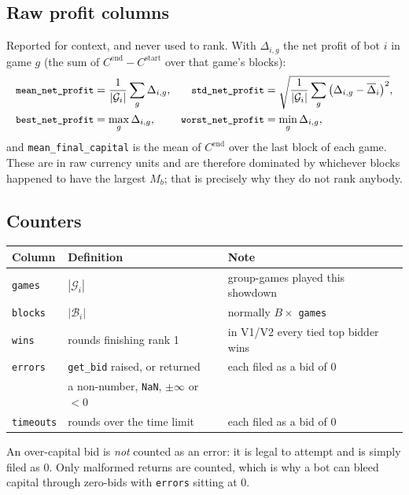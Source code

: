 \documentclass[11pt,a4paper]{article}
\newcommand{\code}[1]{\texttt{\small #1}}
\begin{document}
\subsection{Raw profit columns}
Reported for context, and never used to rank. With $\Delta_{i,g}$ the net profit
of bot $i$ in game $g$ (the sum of $C^{\text{end}} - C^{\text{start}}$ over that
game's blocks):
\begin{align}
  \text{\code{mean\_net\_profit}} &= \frac{1}{|\mathcal{G}_i|}\sum_{g} \Delta_{i,g}, &
  \text{\code{std\_net\_profit}}  &= \sqrt{\frac{1}{|\mathcal{G}_i|}\sum_{g}
      \left(\Delta_{i,g} - \overline{\Delta}_i\right)^2}, \\
  \text{\code{best\_net\_profit}} &= \max_g \Delta_{i,g}, &
  \text{\code{worst\_net\_profit}} &= \min_g \Delta_{i,g},
\end{align}
and \code{mean\_final\_capital} is the mean of $C^{\text{end}}$ over the last
block of each game. These are in raw currency units and are therefore dominated
by whichever blocks happened to have the largest $M_b$; that is precisely why
they do not rank anybody.

\subsection{Counters}
\begin{center}
\begin{tabular}{@{}lll@{}}
\toprule
Column & Definition & Note \\
\midrule
\code{games}    & $|\mathcal{G}_i|$ & group-games played this showdown \\
\code{blocks}   & $|\mathcal{B}_i|$ & normally $B \times$ \code{games} \\
\code{wins}     & rounds finishing rank 1 & in V1/V2 every tied top bidder wins \\
\code{errors}   & \code{get\_bid} raised, or returned & each filed as a bid of $0$ \\
                & a non-number, \code{NaN}, $\pm\infty$ or $<0$ & \\
\code{timeouts} & rounds over the time limit & each filed as a bid of $0$ \\
\bottomrule
\end{tabular}
\end{center}

\noindent
An over-capital bid is \emph{not} counted as an error: it is legal to attempt
and is simply filed as $0$. Only malformed returns are counted, which is why a
bot can bleed capital through zero-bids with \code{errors} sitting at $0$.
\end{document}
